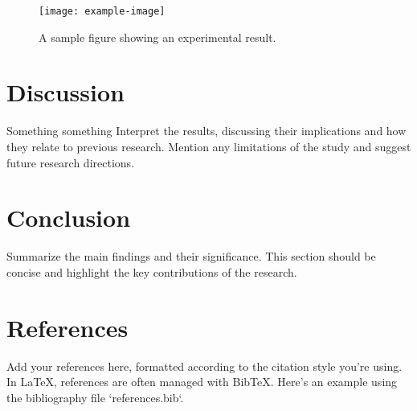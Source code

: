 \documentclass[12pt]{article}
\begin{document}
\begin{figure}[h!]
    \centering
    \texttt{[image: example-image]}
    \caption{A sample figure showing an experimental result.}
    \label{fig:example}
\end{figure}

\section{Discussion}
Something something \cite{Gill}
Interpret the results, discussing their implications and how they relate to previous research. Mention any limitations of the study and suggest future research directions.

\section{Conclusion}
Summarize the main findings and their significance. This section should be concise and highlight the key contributions of the research.

\section{References}
Add your references here, formatted according to the citation style you're using. In LaTeX, references are often managed with BibTeX. Here’s an example using the bibliography file `references.bib`.

\printbibliography 
\end{document}
